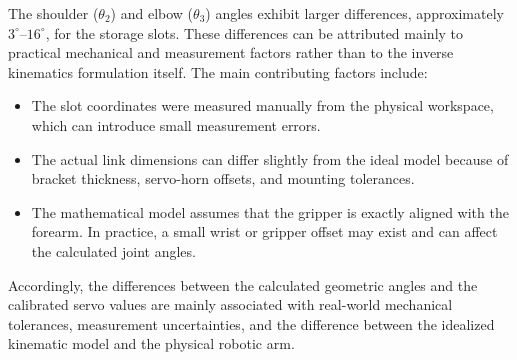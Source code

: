 The shoulder ($\theta_2$) and elbow ($\theta_3$) angles exhibit larger differences, approximately $3^\circ$--$16^\circ$, for the storage slots. These differences can be attributed mainly to practical mechanical and measurement factors rather than to the inverse kinematics formulation itself. The main contributing factors include:

\begin{itemize}
    \item The slot coordinates were measured manually from the physical workspace, which can introduce small measurement errors.
    
    \item The actual link dimensions can differ slightly from the ideal model because of bracket thickness, servo-horn offsets, and mounting tolerances.
    
    \item The mathematical model assumes that the gripper is exactly aligned with the forearm. In practice, a small wrist or gripper offset may exist and can affect the calculated joint angles.
\end{itemize}

Accordingly, the differences between the calculated geometric angles and the calibrated servo values are mainly associated with real-world mechanical tolerances, measurement uncertainties, and the difference between the idealized kinematic model and the physical robotic arm.
\cite{hayat2015robot}